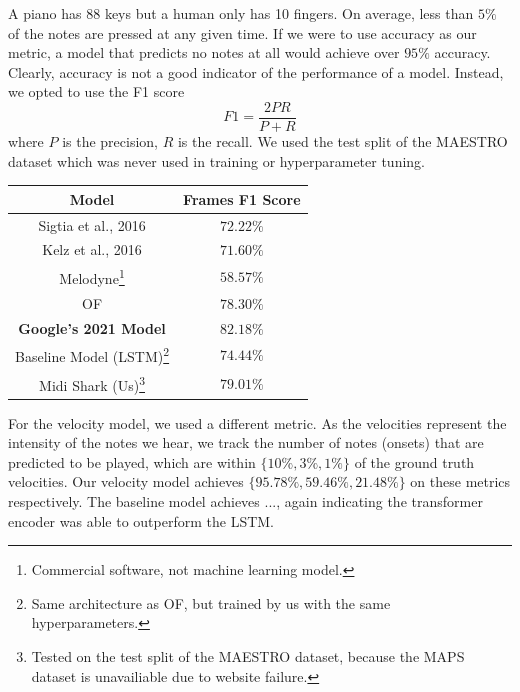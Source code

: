 \documentclass[a4paper,twocolumn,10pt]{article}
\begin{document}
A piano has 88 keys but a human only has 10 fingers. On average, less than $5\%$ of the notes are pressed at any given time. If we were to use accuracy as our metric, a model that predicts no notes at all would achieve over $95\%$ accuracy. Clearly, accuracy is not a good indicator of the performance of a model. Instead, we opted to use the F1 score
\begin{equation}
  F1 = \frac{2PR}{P+R}
\end{equation}
where $P$ is the precision, $R$ is the recall. We used the test split of the MAESTRO dataset which was never used in training or hyperparameter tuning.

\begin{table}
  \begin{minipage}{\linewidth}
    \centering
    \begin{tabular}{|c|c|}
        \hline
        Model& Frames F1 Score \\
        \hline
        Sigtia et al., 2016 & \(72.22\%\)\\
        \hline
        Kelz et al., 2016 & \(71.60\%\)\\
        \hline
        Melodyne\footnote[1]{Commercial software, not machine learning model.} & \(58.57\%\)\\
        \hline
        OF & \(78.30\%\)\\
        \hline
        \textbf{Google’s 2021 Model} & \(\mathbf{82.18\%}\)\\
        \hline
        Baseline Model (LSTM)\footnotemark[2]\footnote[1]{Same architecture as OF, but trained by us with the same hyperparameters.} & \(74.44\%\)\\
        \hline
        Midi Shark (Us)\footnote{Tested on the test split of the MAESTRO dataset, because the MAPS dataset is unavailiable due to website failure.} & \(79.01\%\)\\
        \hline
    \end{tabular}
  \end{minipage}
\end{table}

For the velocity model, we used a different metric. As the velocities represent the intensity of the notes we hear, we track the number of notes (onsets) that are predicted to be played, which are within \(\{10\%, 3\%, 1\%\}\) of the ground truth velocities. Our velocity model achieves \(\{95.78\%, 59.46\%, 21.48\%\}\) on these metrics respectively. The baseline model achieves ..., again indicating the transformer encoder was able to outperform the LSTM.
\end{document}
